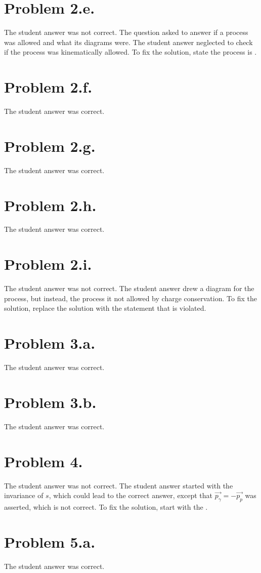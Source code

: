 \documentclass{article}
\begin{document}
\section*{Problem 2.e.}
The student answer was not correct. The question asked to answer if a process was allowed and what its diagrams were. The student answer neglected to check if the process was kinematically allowed.
To fix the solution, state the process is .
\section*{Problem 2.f.}
The student answer was correct.
\section*{Problem 2.g.}
The student answer was correct.
\section*{Problem 2.h.}
The student answer was correct.
\section*{Problem 2.i.}
The student answer was not correct. The student answer drew a diagram for the process, but instead, the process it not allowed by charge conservation. To fix the solution, replace the solution with the statement that  is violated.
\section*{Problem 3.a.}
The student answer was correct.
\section*{Problem 3.b.}
The student answer was correct.
\section*{Problem 4.}
The student answer was not correct. The student answer started with the invariance of $s$, which could lead to the correct answer, except that $\vec{p_\gamma}=-\vec{p_p}$ was asserted, which is not correct. To fix the solution, start with the .
\section*{Problem 5.a.}
The student answer was correct.
\end{document}
